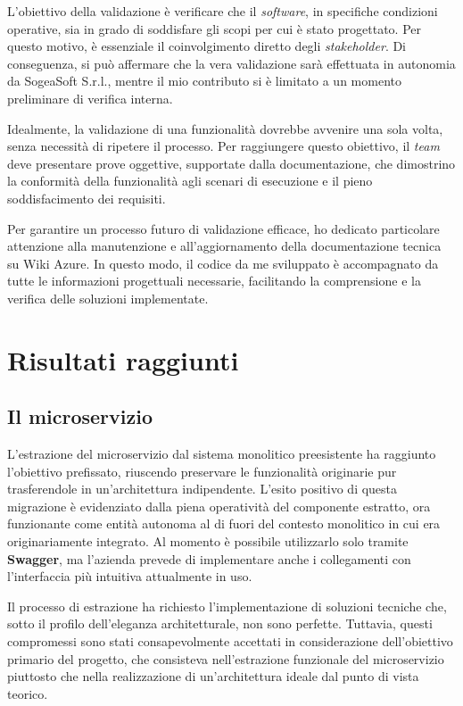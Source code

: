         \vspace{0.2 em}
        \noindent L'obiettivo della validazione è verificare che il \textit{software}, in specifiche condizioni operative, sia in grado di soddisfare gli scopi per cui è stato progettato. Per questo motivo, è essenziale il coinvolgimento diretto degli \textit{stakeholder}. Di conseguenza, si può affermare che la vera validazione sarà effettuata in autonomia da SogeaSoft S.r.l., mentre il mio contributo si è limitato a un momento  preliminare di verifica interna.

        \vspace{0.2 em}
        \noindent Idealmente, la validazione di una funzionalità dovrebbe avvenire una sola volta, senza necessità di ripetere il processo. Per raggiungere questo obiettivo, il \textit{team} deve presentare prove oggettive, supportate dalla documentazione, che dimostrino la conformità della funzionalità agli scenari di esecuzione e il pieno soddisfacimento dei requisiti.  

        \vspace{0.2 em}
        \noindent Per garantire un processo futuro di validazione efficace, ho dedicato particolare attenzione alla manutenzione e all’aggiornamento della documentazione tecnica su Wiki Azure. In questo modo, il codice da me sviluppato è accompagnato da tutte le informazioni progettuali necessarie, facilitando la comprensione e la verifica delle soluzioni implementate.


    \section{Risultati raggiunti}
        \subsection{Il microservizio}
        L'estrazione del microservizio dal sistema monolitico preesistente ha raggiunto l'obiettivo prefissato, riuscendo preservare le funzionalità originarie pur trasferendole in un'architettura indipendente. L'esito positivo di questa migrazione è evidenziato dalla piena operatività del componente estratto, ora funzionante come entità autonoma al di fuori del contesto monolitico in cui era originariamente integrato. Al momento è possibile utilizzarlo solo tramite \textbf{Swagger}, ma l'azienda prevede di implementare anche i collegamenti con l'interfaccia più intuitiva attualmente in uso.

        \vspace{0.2 em}
        \noindent Il processo di estrazione ha richiesto l'implementazione di soluzioni tecniche che, sotto il profilo dell'eleganza architetturale, non sono perfette. Tuttavia, questi compromessi sono stati consapevolmente accettati in considerazione dell'obiettivo primario del progetto, che consisteva nell'estrazione funzionale del microservizio piuttosto che nella realizzazione di un'architettura ideale dal punto di vista teorico.

